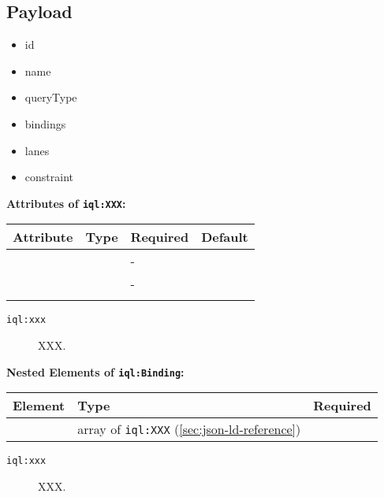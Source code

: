\documentclass[11pt]{article}
\newcommand{\iqlns}{iql:}
\newcommand{\iqlType}[1]{\texttt{\iqlns#1}}
\newcommand{\attributes}[1]{\noindent\textbf{Attributes of \iqlType{#1}:}\newline\medskip}
\newcommand{\elements}[1]{\noindent\textbf{Nested Elements of \iqlType{#1}:}\newline\medskip}
\begin{document}
\subsection{Payload}
\label{sec:json-ld-payload}
\begin{itemize}
\item id
\item name
\item queryType
\item bindings
\item lanes
\item constraint
\end{itemize}
\attributes{XXX}
\begin{tabular}{|p{}|p{}|p{}|p{}|}
	\hline
	\textbf{Attribute} & \textbf{Type} & \textbf{Required} & \textbf{Default} \\ 
	\hline
	\hline
	&  & - &  \\ 
	\hline 
	&  & - &  \\ 
	\hline 
	&  &  & \\ 
	\hline 
\end{tabular}
\begin{description}
	\item[\iqlType{xxx}] XXX.
\end{description}
\elements{Binding}
\begin{tabular}{|p{}|p{}|p{}|}
	\hline
	\textbf{Element} & \textbf{Type} & \textbf{Required} \\ 
	\hline
	\hline 
	& array of \iqlType{XXX} (\ref{sec:json-ld-reference}) &  \\ 
	\hline 
\end{tabular}
\begin{description}
	\item[\iqlType{xxx}] XXX.
\end{description}

\end{document}
